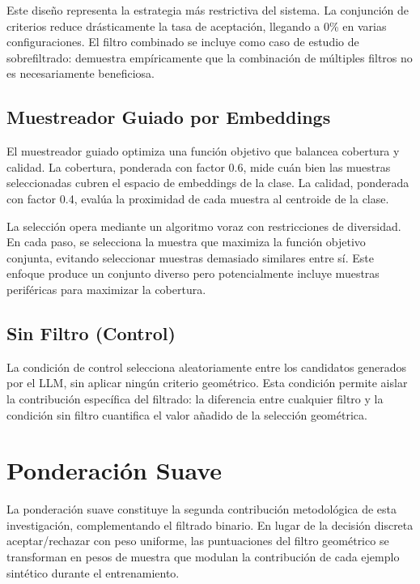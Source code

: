 Este diseño representa la estrategia más restrictiva del sistema. La conjunción de criterios reduce drásticamente la tasa de aceptación, llegando a 0\% en varias configuraciones. El filtro combinado se incluye como caso de estudio de sobrefiltrado: demuestra empíricamente que la combinación de múltiples filtros no es necesariamente beneficiosa.

\subsection{Muestreador Guiado por Embeddings}
\label{subsec:muestreador_guiado}

El muestreador guiado optimiza una función objetivo que balancea cobertura y calidad. La cobertura, ponderada con factor 0.6, mide cuán bien las muestras seleccionadas cubren el espacio de embeddings de la clase. La calidad, ponderada con factor 0.4, evalúa la proximidad de cada muestra al centroide de la clase.

La selección opera mediante un algoritmo voraz con restricciones de diversidad. En cada paso, se selecciona la muestra que maximiza la función objetivo conjunta, evitando seleccionar muestras demasiado similares entre sí. Este enfoque produce un conjunto diverso pero potencialmente incluye muestras periféricas para maximizar la cobertura.

\subsection{Sin Filtro (Control)}
\label{subsec:sin_filtro}

La condición de control selecciona aleatoriamente entre los candidatos generados por el LLM, sin aplicar ningún criterio geométrico. Esta condición permite aislar la contribución específica del filtrado: la diferencia entre cualquier filtro y la condición sin filtro cuantifica el valor añadido de la selección geométrica.

\section{Ponderación Suave}
\label{sec:ponderacion_suave}

La ponderación suave constituye la segunda contribución metodológica de esta investigación, complementando el filtrado binario. En lugar de la decisión discreta aceptar/rechazar con peso uniforme, las puntuaciones del filtro geométrico se transforman en pesos de muestra que modulan la contribución de cada ejemplo sintético durante el entrenamiento.

